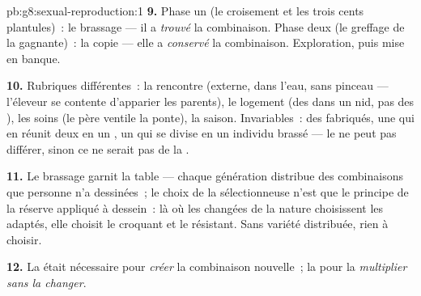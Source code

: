 \begin{solution}{pb:g8:sexual-reproduction:1}
\textbf{9.} Phase un (le croisement et les trois cents plantules)~:
le brassage --- il a \emph{trouvé} la combinaison. Phase deux (le
greffage de la gagnante)~: la copie --- elle a \emph{conservé} la
combinaison. Exploration, puis mise en banque.

\textbf{10.} Rubriques différentes~: la rencontre (externe, dans
l'eau, sans pinceau --- l'éleveur se contente d'apparier les
parents), le logement (des  dans un nid, pas des ), les
soins (le père ventile la ponte), la saison. Invariables~: des
 fabriqués, une  qui en réunit deux en un ,
un  qui se divise en un individu brassé --- le  ne peut
pas différer, sinon ce ne serait pas de la .

\textbf{11.} Le brassage garnit la table --- chaque génération
distribue des combinaisons que personne n'a dessinées~; le choix de
la sélectionneuse n'est que le principe de la réserve appliqué à
dessein~: là où les  changées de la nature choisissent
les adaptés, elle choisit le croquant et le résistant. Sans variété
distribuée, rien à choisir.

\textbf{12.} La  était nécessaire pour
\emph{créer} la combinaison nouvelle~; la 
pour la \emph{multiplier sans la changer}.
\end{solution}
